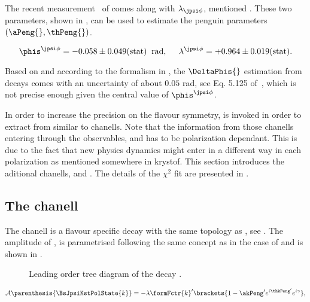 

The recent \lhcb measurement~\cite{phis-3fb-paper} of \phis comes along with $\lambda_{\jpsi\phi}$, mentioned .
These two parameters, shown in , can be used to estimate the penguin parameters $(\aPeng{},\thPeng{})$.

\begin{equation}
  \centering
  \phis^{\jpsi\phi}     =  -0.058 \pm 0.049(\text{stat})  \;\; \text{rad}, \;\;\;\;\;
  \lambda^{\jpsi\phi}   =  +0.964 \pm 0.019(\text{stat}).
  \label{phis_lambda_result}
\end{equation}

\noindent Based on  and according to the formalism in , the $\DeltaPhis{}$ estimation
from \BsJpsiPhi decays comes with an uncertainty of about $0.05$ rad, see Eq. 5.125 of~\cite{DeBruyn-thesis}, which is not precise
enough given the central value of $\phis^{\jpsi\phi}$.

In order to increase the precision on \DeltaPhis{} the \grpsuthree flavour symmetry,
is invoked in order to extract \DeltaPhis{} from similar to \BsJpsiPhi chanells.
Note that the information from those chanells entering through the observables,  and 
has to be polarization dependant. This is due to the fact that new physics dynamics might enter in a different way in each polarization as mentioned {\color{red}somewhere in krystof.}
This section introduces the aditional chanells, \BsJpsiKst and \BdJpsiRho. The details of the $\chi^2$ fit are presented in .


\subsection{The \BsJpsiKst chanell}
\label{bsjpsikst_chanell}

The \BsJpsiKst chanell is a flavour specific decay with the same topology as \BsJpsiPhi, see .
The amplitude of \BsJpsiKst, is parametrised following the same concept as in the case of \BsJpsiPhi and is shown in .

\begin{figure}[h]
  \centering
  {\sffamily }
  \caption{Leading order tree diagram of the decay \BsJpsiPhi.}
  \label{bs2jpsikst}
\end{figure}

\begin{equation}
  \mathcal{A} \parenthesis{\BsJpsiKstPolState{k}} = -\lambda \formFctr{k}' \brackets{ 1 - \akPeng' e^{i\thkPeng'} e^{i\gamma} },
  \label{bsjpsikst_amp}
\end{equation}

